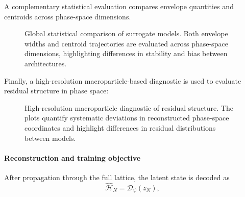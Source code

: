 \documentclass[11pt,a4paper]{article}
\begin{document}
\begin{sloppypar}
A complementary statistical evaluation compares envelope quantities and centroids across phase-space dimensions.

\begin{figure}[H]
\centering
\caption{\small Global statistical comparison of surrogate models. Both envelope widths and centroid trajectories are evaluated across phase-space dimensions, highlighting differences in stability and bias between architectures.}
\label{fig:stats_comparison}
\end{figure}

Finally, a high-resolution macroparticle-based diagnostic is used to evaluate residual structure in phase space:

\begin{figure}[H]
\centering
\caption{\small High-resolution macroparticle diagnostic of residual structure. The plots quantify systematic deviations in reconstructed phase-space coordinates and highlight differences in residual distributions between models.}
\label{fig:macro_residuals}
\end{figure}

\paragraph{Reconstruction and training objective}

After propagation through the full lattice, the latent state is decoded as
\begin{equation}
\widehat{\mathcal{H}}_N = \mathcal{D}_\psi(z_N),
\end{equation}


\end{sloppypar}
\end{document}
